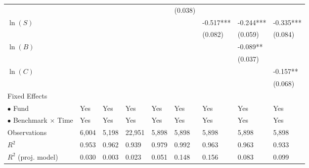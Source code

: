\documentclass[openany]{book}
\theoremstyle{definition}
\theoremstyle{definition}
\theoremstyle{definition}
\theoremstyle{remark}
\begin{document}
\begin{table}[ht]
\begin{tabularx}{0.975\textwidth}{lYYYYYYYY}
   &  &  &  &  & (0.038) &  &  &  \\ 
  $\ln(S)$ &  &  &  &  &  & -0.517*** & -0.244*** & -0.335*** \\ 
   &  &  &  &  &  & (0.082) & (0.059) & (0.084) \\ 
  $\ln(B)$ &  &  &  &  &  &  & -0.089** &  \\ 
   &  &  &  &  &  &  & (0.037) &  \\ 
  $\ln(C)$ &  &  &  &  &  &  &  & -0.157** \\ 
   &  &  &  &  &  &  &  & (0.068) \\ 
  Fixed Effects &  &  &  &  &  &  &  &  \\ 
  $\bullet$ Fund & Yes & Yes & Yes & Yes & Yes & Yes & Yes & Yes \\ 
  $\bullet$ Benchmark $\times$ Time & Yes & Yes & Yes & Yes & Yes & Yes & Yes & Yes \\ 
  Observations & 6,004 & 5,198 & 22,951 & 5,898 & 5,898 & 5,898 & 5,898 & 5,898 \\ 
  $R^2$ & 0.953 & 0.962 & 0.939 & 0.979 & 0.992 & 0.963 & 0.963 & 0.933 \\ 
  $R^2$ (proj. model) & 0.030 & 0.003 & 0.023 & 0.051 & 0.148 & 0.156 & 0.083 & 0.099 \\ 
   \bottomrule
\end{tabularx}
\endgroup
\end{table}
\end{document}
